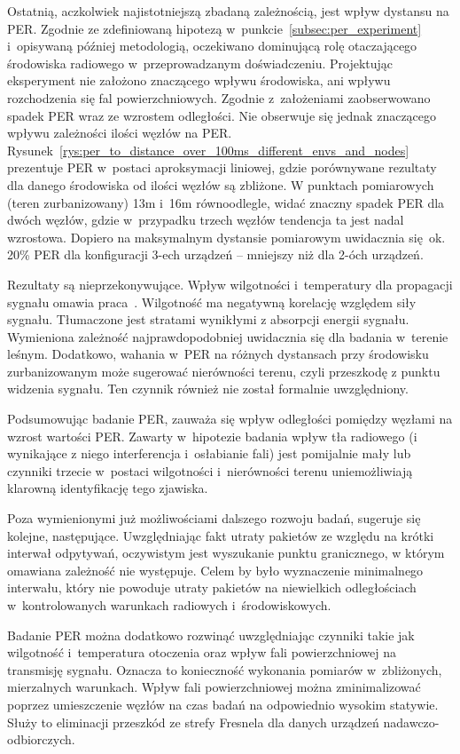 Ostatnią, aczkolwiek najistotniejszą zbadaną zależnością, jest wpływ dystansu na \gls{PER}. Zgodnie ze zdefiniowaną
hipotezą w~punkcie~\ref{subsec:per_experiment} i~opisywaną później metodologią, oczekiwano dominującą rolę otaczającego
środowiska radiowego w~przeprowadzanym doświadczeniu. Projektując eksperyment nie założono znaczącego wpływu środowiska,
ani wpływu rozchodzenia się fal powierzchniowych. Zgodnie z~założeniami zaobserwowano spadek PER wraz ze wzrostem odległości.
Nie obserwuje się jednak znaczącego wpływu zależności ilości węzłów na PER.
Rysunek~\ref{rys:per_to_distance_over_100ms_different_envs_and_nodes} prezentuje PER w~postaci aproksymacji liniowej, gdzie porównywane
rezultaty dla danego środowiska od ilości węzłów są zbliżone. W punktach pomiarowych (teren zurbanizowany) 13m i~16m równoodlegle,
widać znaczny spadek PER dla dwóch węzłów, gdzie w~przypadku trzech węzłów tendencja ta jest nadal wzrostowa. Dopiero na maksymalnym
dystansie pomiarowym uwidacznia się ok. 20\% PER dla konfiguracji 3-ech urządzeń -- mniejszy niż dla 2-óch urządzeń.

Rezultaty są nieprzekonywujące. Wpływ wilgotności i~temperatury dla propagacji sygnału omawia praca~\cite{yi_lim_review_2020}.
Wilgotność ma negatywną korelację względem siły sygnału. Tłumaczone jest stratami wynikłymi z absorpcji energii sygnału. Wymieniona zależność
najprawdopodobniej uwidacznia się dla badania w~terenie leśnym. Dodatkowo, wahania w~PER na różnych dystansach przy środowisku zurbanizowanym
może sugerować nierówności terenu, czyli przeszkodę z punktu widzenia sygnału. Ten czynnik również nie został formalnie uwzględniony.

Podsumowując badanie PER, zauważa się wpływ odległości pomiędzy węzłami na wzrost wartości PER. 
Zawarty w~hipotezie badania wpływ tła radiowego (i wynikające z niego interferencja i~osłabianie fali) jest pomijalnie
mały lub czynniki trzecie w~postaci wilgotności i~nierówności terenu uniemożliwiają klarowną identyfikację tego zjawiska.

Poza wymienionymi już możliwościami dalszego rozwoju badań, sugeruje się kolejne, następujące. Uwzględniając fakt utraty pakietów
ze względu na krótki interwał odpytywań, oczywistym jest wyszukanie punktu granicznego, w którym omawiana zależność nie występuje.
Celem by było wyznaczenie minimalnego interwału, który nie powoduje utraty pakietów na niewielkich odległościach w~kontrolowanych
warunkach radiowych i~środowiskowych.

Badanie PER można dodatkowo rozwinąć uwzględniając czynniki takie jak wilgotność i~temperatura otoczenia oraz wpływ
fali powierzchniowej na transmisję sygnału. Oznacza to konieczność wykonania pomiarów w~zbliżonych, mierzalnych warunkach.
Wpływ fali powierzchniowej można zminimalizować poprzez umieszczenie węzłów na czas badań na odpowiednio wysokim statywie.
Służy to eliminacji przeszkód ze strefy Fresnela dla danych urządzeń nadawczo-odbiorczych.
